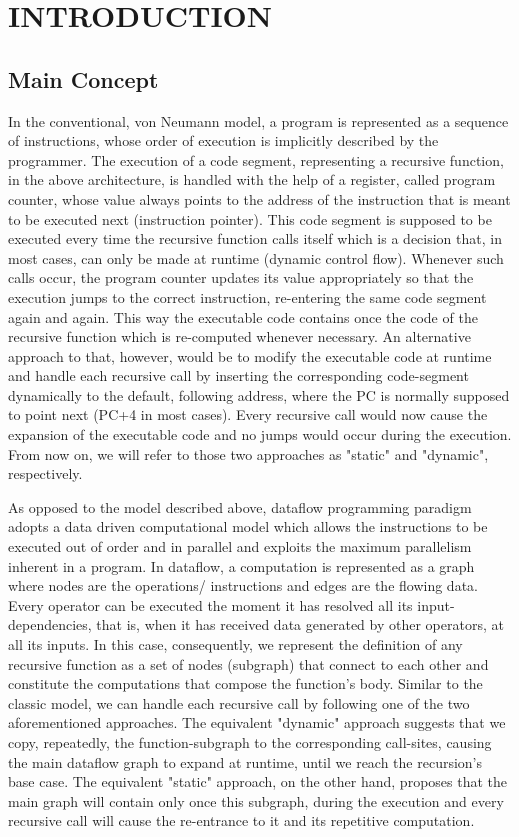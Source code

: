 \documentclass[ack,preface]{dithesis}
\begin{document}
\frontmatter

\mainmatter

\chapter{INTRODUCTION}
    \section{Main Concept}
	In the conventional, von Neumann model, a program is represented as a sequence of instructions, whose order of execution is implicitly described by the programmer.
The execution of a code segment, representing a recursive function, in the above architecture, is handled with the help of a register, called program counter, whose value always points to the address of the instruction that is meant to be executed next (instruction pointer). This code segment is supposed to be executed every time the recursive function calls itself which is a decision that, in most cases, can only be made at runtime (dynamic control flow). Whenever such calls occur, the program counter updates its value appropriately so that the execution jumps to the correct instruction, re-entering the same code segment again and again. This way the executable code contains once the code of the recursive function which is re-computed whenever necessary. An alternative approach to that, however, would be to modify the executable code at runtime  and handle each recursive call by inserting the corresponding code-segment dynamically to the default, following address, where the PC is normally supposed to point next (PC+4 in most cases). Every recursive call would now cause the expansion of the executable code and no jumps would occur during the execution.
From now on, we will refer to those two approaches as "static" and "dynamic", respectively.

As opposed to the model described above, dataflow programming paradigm adopts a data driven computational model which allows the instructions to be executed out of order and in parallel and exploits the maximum parallelism inherent in a program. In dataflow, a computation is represented as a graph where nodes are the operations/ instructions and edges are the flowing data. Every operator can be executed the moment it has resolved all its input-dependencies, that is, when it has received data generated  by other operators, at all its inputs.
In this case, consequently, we represent the definition of any recursive function as  a set of nodes (subgraph) that connect to each other and constitute the computations that compose the function’s body. Similar to the classic model, we can handle each recursive call by following one of the two aforementioned approaches. 
 The equivalent "dynamic" approach suggests that we copy, repeatedly, the function-subgraph to the corresponding call-sites, causing the main dataflow graph to expand at runtime, until we reach the recursion's base case. The equivalent "static" approach, on the other hand, proposes that the main graph will contain only once this subgraph, during the execution and every recursive call will cause the re-entrance to it and its repetitive computation.
\end{document}
